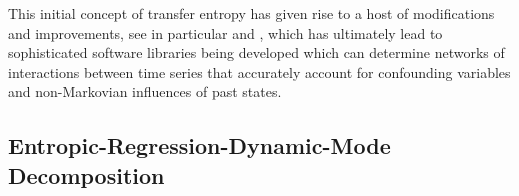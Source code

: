 \documentclass[a4paper,11pt]{article}
\begin{document}
This initial concept of transfer entropy has given rise to a host of modifications and improvements, see in particular \cite{faes} and \cite{bollt}, which has ultimately lead to sophisticated software libraries being developed which can determine networks of interactions between time series that accurately account for confounding variables and non-Markovian influences of past states.  

\subsection{Entropic-Regression-Dynamic-Mode Decomposition}
\end{document}
